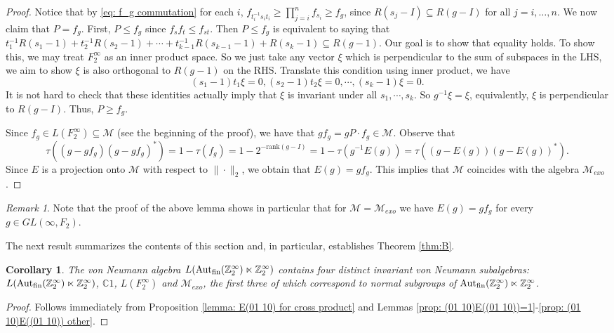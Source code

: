 \documentclass[11pt]{amsart}
\newcommand{\Z}{\mathbb Z}
\newcommand{\C}{\mathbb C}
\newcommand{\fin}{{\rm fin}}
\newcommand{\Aut}{\textup{Aut}}
\theoremstyle{plain}
\newtheorem{corollary}[theorem]{Corollary}
\theoremstyle{definition}
\theoremstyle{remark}
\newtheorem{remark}[theorem]{Remark}
\numberwithin{equation}{section}
\begin{document}
\begin{proof}
Notice that by \eqref{eq: f_g commutation} for each $i$, $f_{t_i^{-1}s_it_i}\geqslant \prod\limits_{j=i}^{n} f_{s_i}\geqslant f_g$, since $R(s_j-I)\subseteq R(g-I)$ for all $j=i, \ldots,n$. We now claim that $P=f_g$. First, $P\leq f_g$ since $f_sf_t\leq f_{st}$. Then $P\leq f_g$ is equivalent to saying that $t_1^{-1}R(s_1-1)+t_2^{-1}R(s_2-1)+\cdots+t_{k-1}^{-1}R(s_{k-1}-1)+R(s_k-1)\subseteq R(g-1)$. Our goal is to show that equality holds. To show this, we may treat $F_2^{\infty}$ as an inner product space. So we just take any vector $\xi$ which is perpendicular to the sum of subspaces in the LHS, we aim to show $\xi$ is also orthogonal to $R(g-1)$ on the RHS. Translate this condition using inner product, we have $$(s_1-1)t_1\xi=0, (s_2-1)t_2\xi=0,\cdots,(s_k-1)\xi=0.$$ It is not hard to check that these identities actually imply that $\xi$ is invariant under all $s_1,\cdots, s_k$. So $g^{-1}\xi=\xi$, equivalently, $\xi$ is perpendicular to $R(g-I)$. Thus, $P\geqslant f_g$. 

Since $f_g\in L(F_2^\infty)\subseteq\mathcal M$ (see the beginning of the proof), we have that $gf_g=gP\cdot f_g\in \mathcal M$. Observe that 
$$\tau((g-gf_g)(g-gf_g)^\ast)=1-\tau(f_g)=1-2^{-\mathrm{rank}(g-I)}=1-\tau(g^{-1}E(g))=\tau((g-E(g))(g-E(g))^*).$$ Since $E$ is a projection onto $\mathcal M$ with respect to $\|\cdot\|_2$, we obtain that $E(g)=gf_g$. This implies that $\mathcal M$ coincides with the algebra $\mathcal{M}_{exo}$.
\end{proof}

\begin{remark}
Note that the proof of the above lemma shows in particular that for $\mathcal{M} = \mathcal{M}_{exo}$ we have $E(g) = gf_g$ for every $g  \in GL(\infty,F_2)$. 
\end{remark}

The next result summarizes the contents of this section and, in particular, establishes Theorem \ref{thm:B}.

\begin{corollary}
	The von Neumann algebra $L(\Aut_\fin (\Z_2^\infty)\ltimes \Z_2^\infty )$ contains four distinct invariant von Neumann subalgebras: $L(\Aut_\fin (\Z_2^\infty)\ltimes \Z_2^\infty )$, $\C 1$, $L(F_2^\infty)$ and $\mathcal{M}_{exo}$, the first three of which correspond to normal subgroups of $\Aut_\fin (\Z_2^\infty)\ltimes \Z_2^\infty $.
\end{corollary}
\begin{proof}
Follows immediately from Proposition \ref{lemma: E(01 10) for cross product} and  Lemmas \ref{prop: (01 10)E((01 10))=1}-\ref{prop: (01 10)E((01 10)) other}.
\end{proof}
\end{document}
